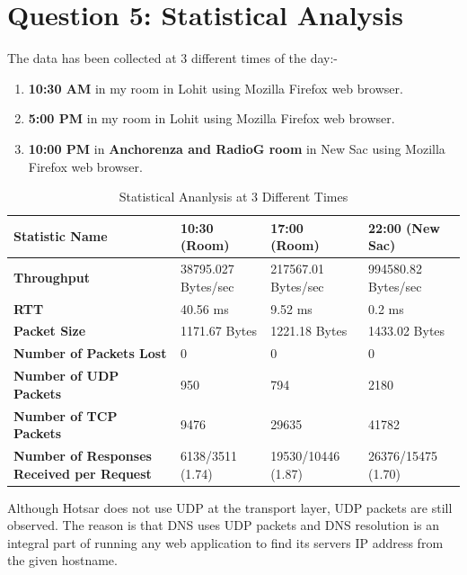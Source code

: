 \documentclass[a4paper,10pt]{article}
\begin{document}
\section*{Question 5: Statistical Analysis}
The data has been collected at 3 different times of the day:-
\begin{enumerate}
	\item \textbf{10:30 AM} in my room in Lohit using Mozilla Firefox web browser.
	\item \textbf{5:00 PM} in my room in Lohit using Mozilla Firefox web browser.
	\item \textbf{10:00 PM} in \textbf{Anchorenza and RadioG room} in New Sac using Mozilla Firefox web browser.
\end{enumerate}
\begin{table}[h]
	\begin{tabularx}{\textwidth}{|p{220pt}||X||X||X|}
		\hline
		\rowcolor{Magenta!40}
		\textbf{Statistic Name} & \textbf{10:30 (Room)} & \textbf{17:00 (Room)} & \textbf{22:00 (New Sac)} \\ \hline
		\textbf{Throughput}  & 38795.027 Bytes/sec & 217567.01 Bytes/sec & 994580.82 Bytes/sec \\ \hline
		\textbf{RTT}  & 40.56 ms & 9.52 ms & 0.2 ms \\ \hline
		\textbf{Packet Size} & 1171.67 Bytes & 1221.18 Bytes & 1433.02 Bytes \\ \hline
		\textbf{Number of Packets Lost}  & 0 & 0 & 0\\ \hline
		\textbf{Number of UDP Packets} & 950 & 794 & 2180 \\ \hline
		\textbf{Number of TCP Packets}& 9476 & 29635 & 41782\\ \hline
		\textbf{Number of Responses Received per Request}& 6138/3511 (1.74) & 19530/10446 (1.87) & 26376/15475 (1.70)\\ \hline
	\end{tabularx}
	\caption{Statistical Ananlysis at 3 Different Times}
\end{table}
Although Hotsar does not use UDP at the transport layer, UDP packets are still observed. The reason is that DNS uses UDP packets and DNS resolution is an integral part of running any web application to find its servers IP address from the given hostname.
\end{document}
